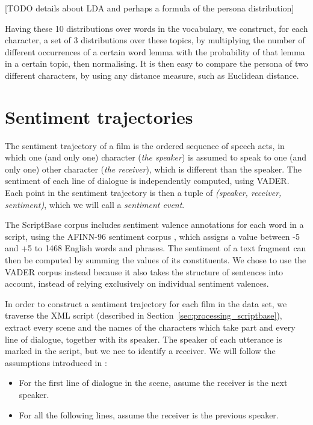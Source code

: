 \documentclass[bsc,frontabs,singlespacing,parskip, twoside]{infthesis}
\begin{document}
[TODO details about LDA and perhaps a formula of the persona distribution]

Having these 10 distributions over words in the vocabulary, we construct, for each character, a set of 3 distributions over these topics, by multiplying the number of different occurrences of a certain word lemma with the probability of that lemma in a certain topic, then normalising. It is then easy to compare the persona of two different characters, by using any distance measure, such as Euclidean distance.

\section{Sentiment trajectories}
\label{sec:trajectories}
The sentiment trajectory of a film is the ordered sequence of speech acts, in which one (and only one) character (\textit{the speaker}) is assumed to speak to one (and only one) other character (\textit{the receiver}), which is different than the speaker. The sentiment of each line of dialogue is independently computed, using VADER. Each point in the sentiment trajectory is then a tuple of \textit{(speaker, receiver, sentiment)}, which we will call a \textit{sentiment event}.

The ScriptBase corpus includes sentiment valence annotations for each word in a script, using the AFINN-96 sentiment corpus \cite{nielsen2011new}, which assigns a value between -5 and +5 to 1468 English words and phrases. The sentiment of a text fragment can then be computed by summing the values of its constituents. We chose to use the VADER corpus instead because it also takes the structure of sentences into account, instead of relying exclusively on individual sentiment valences.

In order to construct a sentiment trajectory for each film in the data set, we traverse the XML script (described in Section~\ref{sec:processing_scriptbase}), extract every scene and the names of the characters which take part and every line of dialogue, together with its speaker. The speaker of each utterance is marked in the script, but we nee to identify a receiver. We will follow the assumptions introduced in \cite{Nalisnick2013}:
\begin{itemize}
	\item For the first line of dialogue in the scene, assume the receiver is the next speaker.
	\item For all the following lines, assume the receiver is the previous speaker.
\end{itemize}
\end{document}
